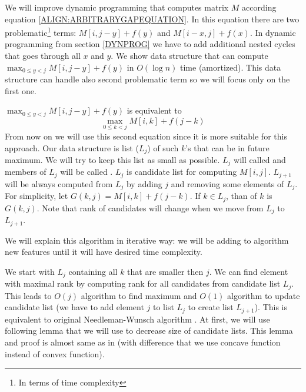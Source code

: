 We will improve dynamic programming that computes matrix $M$ according equation
\ref{ALIGN:ARBITRARYGAPEQUATION}. In this equation there are two
problematic\footnote{In terms of time complexity} terms: $M[i,j-y]+f(y)$ and
$M[i-x,j]+f(x)$. In dynamic programming from section \ref{DYNPROG} we  have
to add additional nested cycles that goes through all $x$ and $y$. We show data
structure that can compute $\max_{0\leq y < j}M[i,j-y]+f(y)$ in $O(\log n)$ time
(amortized). This data structure can handle also second problematic term so we
will focus only on the first one.

$\max_{0\leq y < j}M[i,j-y]+f(y)$ is equivalent to
\begin{equation}
\max_{0\leq k < j}M[i,k]+f(j-k)\label{CONVEX:MAXFUNCTION}
\end{equation}
From now on we will use this second equation since it is more suitable for this
approach.  Our data structure is list ($L_j$) of such $k$'s that can be in
future maximum. We will try to keep this list as small as possible. $L_j$ will
called  and members of $L_j$ will be called
. $L_j$ is candidate list for computing $M[i,j]$.
$L_{j+1}$ will be always computed from $L_j$ by adding $j$ and removing some
elements of $L_j$. For simplicity, let $G(k,j) = M[i,k]+f(j-k)$. If $k\in L_j$,
than  of $k$ is $G(k,j)$. Note that rank of candidates will
change when we move from $L_j$ to $L_{j+1}$.

We will explain this algorithm in iterative way: we will be adding to algorithm
new features until it will have desired time complexity. 

We start with $L_j$ containing all $k$ that are smaller then $j$.  We can find
element with maximal rank by computing rank for all candidates from candidate
list $L_j$. This leads to $O(j)$ algorithm to find maximum and $O(1)$ algorithm
to update candidate list (we have to add element $j$ to list $L_{j}$ to create
list $L_{j+1}$). This is equivalent to original Needleman-Wunsch algorithm
\cite{Needleman1970}. At first, we will use following lemma that we will use to
decrease size of candidate lists. This lemma and proof is almost same as in
\cite{GusfieldBook} (with difference that we use concave function instead of
convex function).

